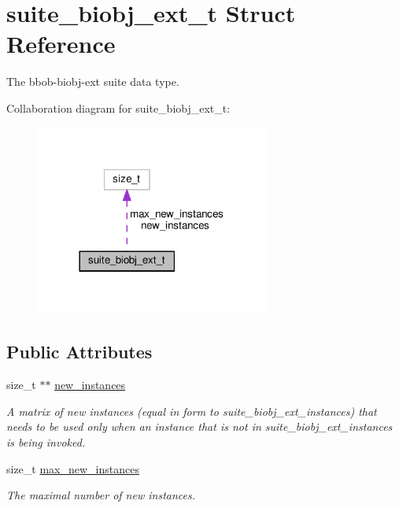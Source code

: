 \hypertarget{structsuite__biobj__ext__t}{}\section{suite\+\_\+biobj\+\_\+ext\+\_\+t Struct Reference}
\label{structsuite__biobj__ext__t}


The bbob-\/biobj-\/ext suite data type.  




Collaboration diagram for suite\+\_\+biobj\+\_\+ext\+\_\+t\+:\nopagebreak
\begin{figure}[H]
\begin{center}
\leavevmode
\includegraphics[width=218pt]{structsuite__biobj__ext__t__coll__graph}
\end{center}
\end{figure}
\subsection*{Public Attributes}
\begin{DoxyCompactItemize}
\item 
size\+\_\+t $\ast$$\ast$ \hyperlink{structsuite__biobj__ext__t_abfc510683f063b4c91a3646167b0d46c}{new\+\_\+instances}\hypertarget{structsuite__biobj__ext__t_abfc510683f063b4c91a3646167b0d46c}{}\label{structsuite__biobj__ext__t_abfc510683f063b4c91a3646167b0d46c}

\begin{DoxyCompactList}\small\item\em A matrix of new instances (equal in form to suite\+\_\+biobj\+\_\+ext\+\_\+instances) that needs to be used only when an instance that is not in suite\+\_\+biobj\+\_\+ext\+\_\+instances is being invoked. \end{DoxyCompactList}\item 
size\+\_\+t \hyperlink{structsuite__biobj__ext__t_af1b889f3d399703e6b25177348ece250}{max\+\_\+new\+\_\+instances}\hypertarget{structsuite__biobj__ext__t_af1b889f3d399703e6b25177348ece250}{}\label{structsuite__biobj__ext__t_af1b889f3d399703e6b25177348ece250}

\begin{DoxyCompactList}\small\item\em The maximal number of new instances. \end{DoxyCompactList}\end{DoxyCompactItemize}


